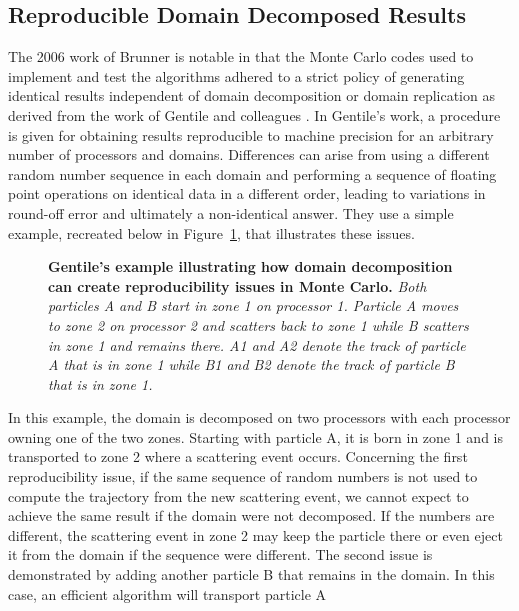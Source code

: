 \subsection{Reproducible Domain Decomposed Results}
\label{sec:reproducible_mc}
The 2006 work of Brunner is notable in that the Monte Carlo codes used
to implement and test the algorithms adhered to a strict policy of
generating identical results independent of domain decomposition or
domain replication as derived from the work of Gentile and colleagues
\citep{gentile_obtaining_2005}. In Gentile's work, a procedure is
given for obtaining results reproducible to machine precision for an
arbitrary number of processors and domains. Differences can arise from
using a different random number sequence in each domain and performing
a sequence of floating point operations on identical data in a
different order, leading to variations in round-off error and
ultimately a non-identical answer. They use a simple example,
recreated below in Figure~\ref{fig:gentile_example}, that illustrates
these issues.
\begin{figure}[t!]
  \begin{center}
    \scalebox{1.5}{
       }
  \end{center}
  \caption{\textbf{Gentile's example illustrating how domain
      decomposition can create reproducibility issues in Monte Carlo.}
    \textit{Both particles A and B start in zone 1 on processor
      1. Particle A moves to zone 2 on processor 2 and scatters back
      to zone 1 while B scatters in zone 1 and remains there. A1 and
      A2 denote the track of particle A that is in zone 1 while B1 and
      B2 denote the track of particle B that is in zone 1.}}
  \label{fig:gentile_example}
\end{figure}
In this example, the domain is decomposed on two processors with each
processor owning one of the two zones. Starting with particle A, it is
born in zone 1 and is transported to zone 2 where a scattering event
occurs. Concerning the first reproducibility issue, if the same
sequence of random numbers is not used to compute the trajectory from
the new scattering event, we cannot expect to achieve the same result
if the domain were not decomposed. If the numbers are different, the
scattering event in zone 2 may keep the particle there or even eject
it from the domain if the sequence were different. The second issue is
demonstrated by adding another particle B that remains in the
domain. In this case, an efficient algorithm will transport particle A
